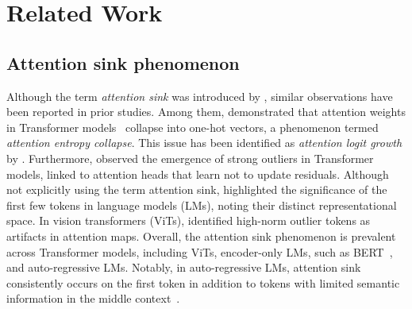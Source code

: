 \documentclass{article} \usepackage{iclr2025_conference,times}
\begin{document}



\clearpage

\appendix

\section{Related Work}\label{related_work}

\vspace{-0.05cm}
\subsection{Attention sink phenomenon} 
\vspace{-0.05cm}
Although the term \textit{attention sink} was introduced by \citet{xiao2023efficient}, similar observations have been reported in prior studies. Among them, \citet{zhai2023stabilizing} demonstrated that attention weights in Transformer models~\citep{vaswani2017attention} collapse into one-hot vectors, a phenomenon termed \textit{attention entropy collapse}. This issue has been identified as \textit{attention logit growth} by \citet{wortsman2023small, dehghani2023scaling}. Furthermore, \citet{bondarenko2023quantizable} observed the emergence of strong outliers in Transformer models, linked to attention heads that learn not to update residuals. Although not explicitly using the term attention sink, \citet{han2024lm} highlighted the significance of the first few tokens in language models (LMs), noting their distinct representational space. In vision transformers (ViTs), \citet{darcet2023vision} identified high-norm outlier tokens as artifacts in attention maps. Overall, the attention sink phenomenon is prevalent across Transformer models, including ViTs, encoder-only LMs, such as BERT~\citep{devlin2019bert}, and auto-regressive LMs. Notably, in auto-regressive LMs, attention sink consistently occurs on the first token in addition to tokens with limited semantic information in the middle context~\citep{sun2024massive,yu2024unveiling}.

\vspace{-0.05cm}
\end{document}
